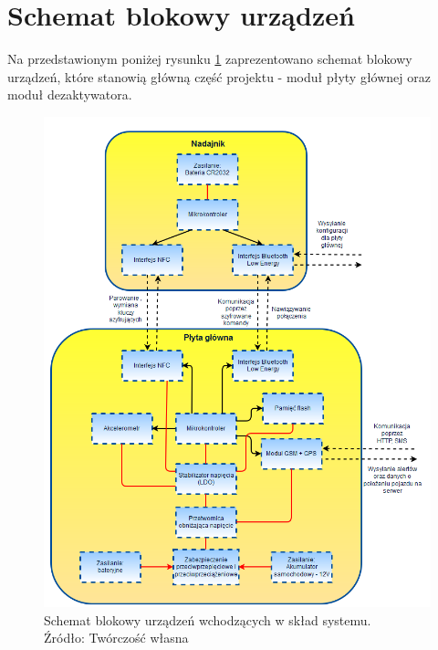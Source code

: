 \section{Schemat blokowy urządzeń}
\label{Schemat_blokowy_urządzen}
Na przedstawionym poniżej rysunku \ref{fig:image_device_block_diagram} zaprezentowano schemat blokowy urządzeń, które stanowią główną część projektu - moduł płyty głównej oraz moduł dezaktywatora. 

\begin{figure}[h]
	\centering
	\includegraphics[width=13cm]{img/introduction/device_block_diagram.jpg}
	\caption{Schemat blokowy urządzeń wchodzących w skład systemu. \\ Źródło: Twórczość własna}
	\label{fig:image_device_block_diagram}
\end{figure}
	
	
